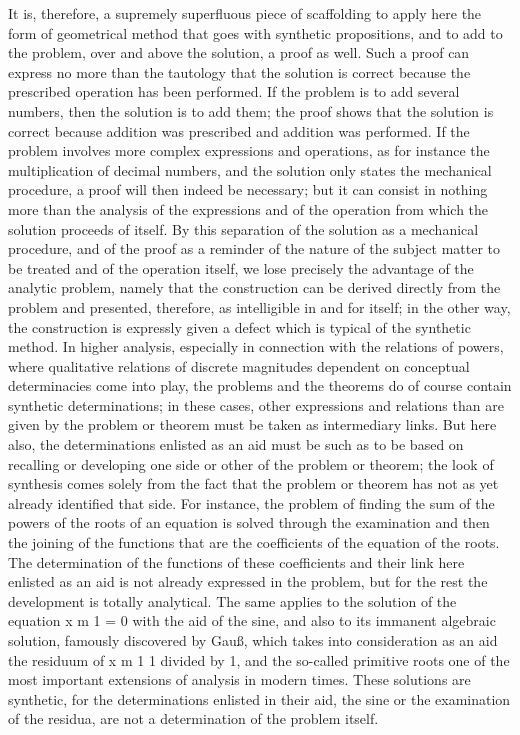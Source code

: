 It is, therefore, a supremely superfluous piece of scaffolding
to apply here the form of geometrical method
that goes with synthetic propositions,
and to add to the problem,
over and above the solution,
a proof as well.
Such a proof can express no more than
the tautology that the solution is correct
because the prescribed operation has been performed.
If the problem is to add several numbers,
then the solution is to add them;
the proof shows that the solution is correct
because addition was prescribed
and addition was performed.
If the problem involves more complex expressions and operations,
as for instance the multiplication of decimal numbers,
and the solution only states the mechanical procedure,
a proof will then indeed be necessary;
but it can consist in nothing more than
the analysis of the expressions
and of the operation from which
the solution proceeds of itself.
By this separation of the solution
as a mechanical procedure,
and of the proof as a reminder of
the nature of the subject matter to be treated
and of the operation itself,
we lose precisely the advantage of the analytic problem,
namely that the construction can be derived directly from the
problem and presented, therefore,
as intelligible in and for itself;
in the other way,
the construction is expressly given a defect
which is typical of the synthetic method.
In higher analysis, especially in connection with
the relations of powers,
where qualitative relations of discrete magnitudes
dependent on conceptual determinacies come into play,
the problems and
the theorems do of course contain synthetic determinations;
in these cases,
other expressions and relations than are
given by the problem or theorem
must be taken as intermediary links.
But here also, the determinations
enlisted as an aid must be such as
to be based on recalling or developing
one side or other of the problem or theorem;
the look of synthesis comes
solely from the fact that the problem
or theorem has not as yet already
identified that side.
For instance, the problem of finding
the sum of the powers of the roots of an equation is
solved through the examination and then the joining of
the functions that are the coefficients of
the equation of the roots.
The determination of the functions of these coefficients
and their link here enlisted as an aid is not
already expressed in the problem,
but for the rest the development is totally analytical.
The same applies to the solution of the equation
x m 1 = 0 with the aid of the sine,
and also to its immanent algebraic solution,
famously discovered by Gauß,
which takes into consideration as an aid
the residuum of x m 1
1 divided by 1,
and the so-called primitive roots
one of the most important extensions of analysis in modern times.
These solutions are synthetic,
for the determinations enlisted in their aid,
the sine or the examination of the residua,
are not a determination of the problem itself.

